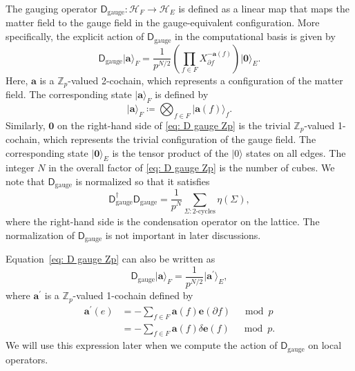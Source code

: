\documentclass[aps,twocolumn,prx,floatfix,preprintnumbers, nofootinbib,10pt]{revtex4-2}
\numberwithin{equation}{section}
\theoremstyle{definition}
\theoremstyle{remark}
\theoremstyle{claim}
\def\ket#1{{|{#1}\rangle}}
\begin{document}
The gauging operator $\mathsf{D}_{\mathrm{gauge}}: \mathcal{H}_F \to \mathcal{H}_E$ is defined as a linear map that maps the matter field to the gauge field in the gauge-equivalent configuration.
More specifically, the explicit action of $\mathsf{D}_{\mathrm{gauge}}$ in the computational basis is given by
\begin{equation}
\mathsf{D}_{\mathrm{gauge}} \ket{\bm{a}}_F = \frac{1}{p^{N/2}} \left( \prod_{f \in F} X_{\partial f}^{- \bm{a}(f)} \right) \ket{\bm{0}}_E.
\label{eq: D gauge Zp}
\end{equation}
Here, $\bm{a}$ is a $\mathbb{Z}_p$-valued 2-cochain, which represents a configuration of the matter field.
The corresponding state $\ket{\bm{a}}_F$ is defined by
\begin{equation}
\ket{\bm{a}}_F \coloneq \bigotimes_{f \in F} \ket{\bm{a}(f)}_f.
\end{equation}
Similarly, $\bm{0}$ on the right-hand side of \eqref{eq: D gauge Zp} is the trivial $\mathbb{Z}_p$-valued 1-cochain, which represents the trivial configuration of the gauge field.
The corresponding state $\ket{\bm{0}}_E$ is the tensor product of the $\ket{0}$ states on all edges.
The integer $N$ in the overall factor of \eqref{eq: D gauge Zp} is the number of cubes.
We note that $\mathsf{D}_{\mathrm{gauge}}$ is normalized so that it satisfies
\begin{equation}
\mathsf{D}_{\mathrm{gauge}}^{\dagger} \mathsf{D}_{\mathrm{gauge}} = \frac{1}{p^N} \sum_{\Sigma: \text{2-cycles}} \eta(\Sigma),
\end{equation}
where the right-hand side is the condensation operator on the lattice.
The normalization of $\mathsf{D}_{\mathrm{gauge}}$ is not important in later discussions.

Equation~\eqref{eq: D gauge Zp} can also be written as
\begin{equation}
\mathsf{D}_{\mathrm{gauge}} \ket{\bm{a}}_F = \frac{1}{p^{N/2}} \ket{\bm{a}^{\prime}}_E,
\label{eq: D gauge Zp2}
\end{equation}
where $\bm{a}^{\prime}$ is a $\mathbb{Z}_p$-valued 1-cochain defined by
\begin{equation}
\begin{aligned}
\bm{a}^{\prime}(e) &= -\sum_{f \in F} \bm{a}(f) \bm{e}(\partial f) \quad \bmod p \\
&= -\sum_{f \in F} \bm{a}(f) \delta \bm{e}(f) \quad \bmod p.
\end{aligned}
\label{eq: a prime Zp}
\end{equation}
We will use this expression later when we compute the action of $\mathsf{D}_{\mathrm{gauge}}$ on local operators.
\end{document}
